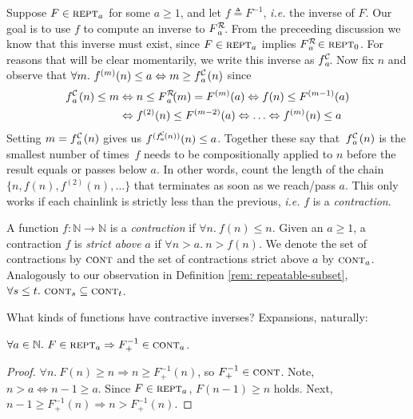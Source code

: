 Suppose $F \in \text{\scshape{rept}}_a$ for some $a \ge 1$, and 
let $f \triangleq F^{-1}$, \emph{i.e.} the inverse of $F$.
Our goal is to use $f$ to compute an inverse to $\rf{F}{a}$.  
From the preceeding discussion we know that this inverse must exist, 
since $F \in \text{\scshape{rept}}_a$ implies $\rf{F}{a} \in \repeatable_0$.  
For reasons that will be clear momentarily, we write this inverse as $\cdt{f}{a}$.  Now
fix $n$ and observe that $\forall m.~f^{(m)}(n)\le a \iff m \ge \cdt{f}{a}(n)$ 
since
\vspace{-0.5em}
\begin{equation} \label{eq: rf-upp-inv}
\begin{aligned}
\cdt{f}{a}(n)\le m & \iff n\le \rf{F}{a}(m) = F^{(m)}(a) \iff f(n)\le F^{(m-1)}(a) \\
& \iff f^{(2)}(n)\le F^{(m-2)}(a) \iff \ldots \iff f^{(m)}(n)\le a
\end{aligned}
\vspace{-0.5em}
\end{equation}
Setting $m = \cdt{f}{a}(n)$ gives us 
$f^{(\cdt{f}{a}(n))}(n) \le a$.  
Together these say that~$\cdt{f}{a}(n)$ is the smallest number of 
times~$f$ needs to be compositionally applied to $n$ before the result 
equals or passes below $a$.
In other words, count the length of the chain $\{n, f(n), f^{(2)}(n), \ldots\}$ that 
terminates as soon as we reach/pass $a$. 
This only works if each chainlink is strictly less than the previous, 
\emph{i.e.} $f$ is a \emph{contraction}.
\begin{defn} \label{defn: contracting}
	A function $f : \mathbb{N} \to \mathbb{N}$ is a \emph{contraction} if $\forall n.~ f(n) \le n$. Given an $a \ge 1$, a contraction $f$ is 
	\emph{strict above} $a$ if $\forall n > a.~n > f(n)$. We denote the set of contractions by $\text{\scshape{cont}}$ and the set of contractions strict above $a$ by $\text{\scshape{cont}}_a$. Analogously to our observation in 
	Definition \ref{rem: repeatable-subset}, $\forall s\le t.~ \text{\scshape{cont}}_s \subseteq \text{\scshape{cont}}_t$.
\end{defn}
What kinds of functions have contractive inverses? Expansions, naturally:
\begin{thm} \label{thm: expansion-inv-contraction}
$\forall a\in \mathbb{N}.~F\in \text{\scshape{rept}}_a \Rightarrow F^{-1}_+ \in \text{\scshape{cont}}_a$.
\end{thm}
\begin{proof}
$\forall n.~F(n)\ge n \Rightarrow n \ge F^{-1}_+(n)$, so $F^{-1}_+ \in
\text{\scshape{cont}}$. Note, $n > a \iff n-1\ge a$.
Since $F\in \text{\scshape{rept}}_a$, $F(n-1)\ge n$ holds. 
Next, $n-1\ge F^{-1}_+(n) \Rightarrow n > F^{-1}_+(n)$. 
\end{proof}
